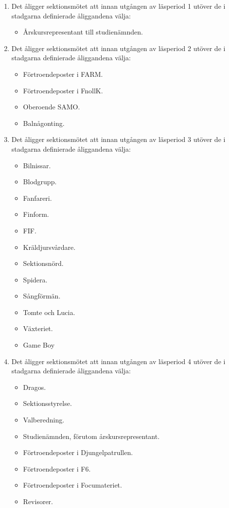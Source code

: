\documentclass[11pt,a4paper]{article}
\begin{document}
\begin{enumerate}[\thesubsection .1]

  \item Det åligger sektionsmötet att innan utgången av läsperiod 1
  utöver de i stadgarna definierade åliggandena välja:
    \begin{itemize}
      \item Årskursrepresentant till studienämnden.
    \end{itemize}

  \item Det åligger sektionsmötet att innan utgången av läsperiod 2
    utöver de i stadgarna definierade åliggandena välja:
    \begin{itemize}
      \item Förtroendeposter i FARM.
      \item Förtroendeposter i FnollK.
      \item Oberoende SAMO.
      \item Balnågonting.
    \end{itemize}

  \item Det åligger sektionsmötet att innan utgången av läsperiod 3
    utöver de i stadgarna definierade åliggandena välja:
    \begin{itemize}
      \item Bilnissar.
      \item Blodgrupp.
      \item Fanfareri.
      \item Finform.
      \item FIF.
      \item Kräldjursvårdare.
      \item Sektionsnörd.
      \item Spidera.
      \item Sångförmän.
      \item Tomte och Lucia.
      \item Växteriet.
      \item Game Boy
    \end{itemize}

  \item Det åligger sektionsmötet att innan utgången av  läsperiod 4
    utöver de i stadgarna definierade åliggandena välja:
    \begin{itemize}
      \item Dragos.
      \item Sektionsstyrelse.
      \item Valberedning.
      \item Studienämnden, förutom årskursrepresentant.
      \item Förtroendeposter i Djungelpatrullen.
      \item Förtroendeposter i F6.
      \item Förtroendeposter i Focumateriet.
       \item Revisorer.
    \end{itemize}

\end{enumerate}
\end{document}
